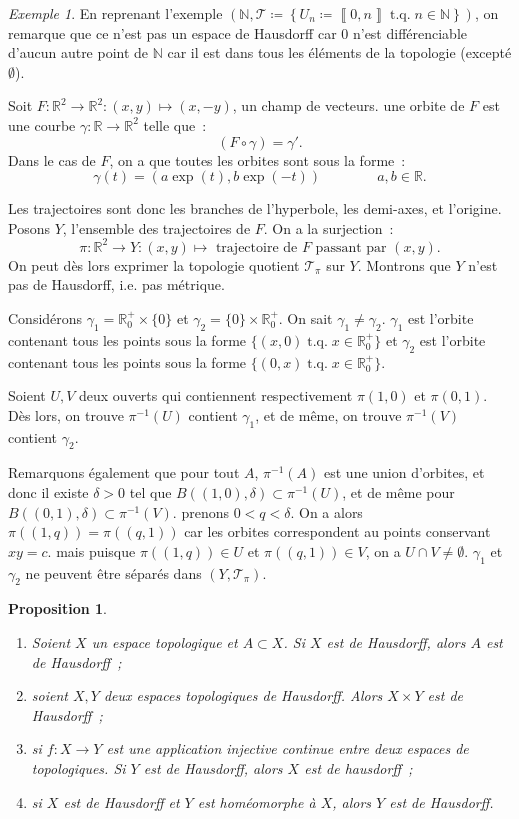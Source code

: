 \documentclass{report}
\newtheorem{prp}[thm]{Proposition}
\theoremstyle{definition}
\theoremstyle{remark}
\newtheorem{ex}{Exemple}[chapter]
\DeclareMathOperator{\tq}{\text{ t.q. }}
\newcommand{\intint}[2]{\left\llbracket#1, #2\right\rrbracket}
\newcommand{\R}{\mathbb R}
\newcommand{\N}{\mathbb N}
\renewcommand{\top}{\mathcal T}
\begin{document}
	\begin{ex} En reprenant l'exemple $\left(\N, \top \coloneqq \left\{U_n \coloneqq \intint 0n \tq n \in \N\right\}\right)$, on remarque que ce n'est pas un espace de
	Hausdorff car $0$ n'est différenciable d'aucun autre point de $\N$ car il est dans tous les éléments de la topologie (excepté $\emptyset$).

	Soit $F : \R^2 \to \R^2 : (x, y) \mapsto (x, -y)$, un champ de vecteurs. une orbite de $F$ est une courbe $\gamma : \R \to \R^2$ telle que~:
	\[(F \circ \gamma) = \gamma'.\]
	Dans le cas de $F$, on a que toutes les orbites sont sous la forme~:
	\[\gamma(t) = (a\exp(t), b\exp(-t))\qquad\qquad a, b \in \R.\]

	Les trajectoires sont donc les branches de l'hyperbole, les demi-axes, et l'origine. Posons $Y$, l'ensemble des trajectoires de $F$. On a la surjection~:
	\[\pi : \R^2 \to Y : (x, y) \mapsto \text{ trajectoire de $F$ passant par $(x, y)$}.\]
	On peut dès lors exprimer la topologie quotient $\top_\pi$ sur $Y$. Montrons que $Y$ n'est pas de Hausdorff, i.e. pas métrique.

	Considérons $\gamma_1 = \R^+_0 \times \{0\}$ et $\gamma_2 = \{0\} \times \R^+_0$. On sait $\gamma_1 \neq \gamma_2$. $\gamma_1$ est l'orbite contenant tous les
	points sous la forme $\{(x, 0) \tq x \in \R^+_0\}$ et $\gamma_2$ est l'orbite contenant tous les points sous la forme $\{(0, x) \tq x \in \R^+_0\}$.

	Soient $U, V$ deux ouverts qui contiennent respectivement $\pi(1, 0)$ et $\pi(0, 1)$. Dès lors, on trouve $\pi^{-1}(U)$ contient $\gamma_1$, et de même, on
	trouve $\pi^{-1}(V)$ contient $\gamma_2$.

	Remarquons également que pour tout $A$, $\pi^{-1}(A)$ est une union d'orbites, et donc il existe $\delta > 0$ tel que $B((1, 0), \delta) \subset \pi^{-1}(U)$, et de
	même pour $B((0, 1), \delta) \subset \pi^{-1}(V)$. prenons $0 < q < \delta$. On a alors $\pi((1, q)) = \pi((q, 1))$ car les orbites correspondent au points
	conservant $xy = c$. mais puisque $\pi((1, q)) \in U$ et $\pi((q, 1)) \in V$, on a $U \cap V \neq \emptyset$. $\gamma_1$ et $\gamma_2$ ne peuvent être séparés
	dans $(Y, \top_\pi)$.
	\end{ex}

	\begin{prp}~
	\begin{enumerate}
		\item Soient $X$ un espace topologique et $A \subset X$. Si $X$ est de Hausdorff, alors $A$ est de Hausdorff~;
		\item soient $X, Y$ deux espaces topologiques de Hausdorff. Alors $X \times Y$ est de Hausdorff~;
		\item si $f : X \to Y$ est une application injective continue entre deux espaces de topologiques. Si $Y$ est de Hausdorff, alors $X$ est de hausdorff~;
		\item si $X$ est de Hausdorff et $Y$ est homéomorphe à $X$, alors $Y$ est de Hausdorff.
	\end{enumerate}
	\end{prp}
\end{document}
